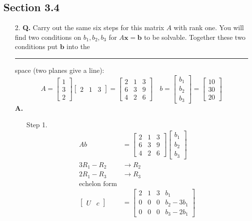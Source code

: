 \documentclass[main.tex]{subfiles}
\begin{document}
\subsection{Section 3.4}
\begin{enumerate}
    \item [2.] \textbf{Q.} Carry out the same six steps for this matrix $A$ with rank one. You will find two conditions on $b_{1}, b_{2}, b_{3}$ for $A \bm{x}=\bm{b}$ to be solvable. Together these two conditions put $\bm{b}$ into the \rule{1cm}{0.15mm} space (two planes give a line):
    $$
    A=\left[\begin{array}{l}
    1 \\
    3 \\
    2
    \end{array}\right]\left[\begin{array}{lll}
    2 & 1 & 3
    \end{array}\right]=\left[\begin{array}{lll}
    2 & 1 & 3 \\
    6 & 3 & 9 \\
    4 & 2 & 6
    \end{array}\right] \quad b=\left[\begin{array}{l}
    b_{1} \\
    b_{2} \\
    b_{3}
    \end{array}\right]=\left[\begin{array}{l}
    10 \\
    30 \\
    20
    \end{array}\right]
    $$
    \textbf{A.}
    \begin{enumerate}
        \item [Step 1.]
        $$
        \begin{aligned}
        A b &= \left[\begin{array}{lll}
        2 & 1 & 3 \\
        6 & 3 & 9 \\
        4 & 2 & 6
        \end{array}\right] \left[\begin{array}{l}
        b_{1} \\
        b_{2} \\
        b_{3}
        \end{array}\right]\\
        3R_1 - R_2 & \rightarrow R_2\\
        2R_1 - R_3 & \rightarrow R_3\\
        \text{echelon form} & \\
        \left[\begin{array}{ll}
        U & c
        \end{array}\right] &= \left[\begin{array}{cccc}
        2 & 1 & 3 & b_1 \\
        0 & 0 & 0 & b_2 - 3 b_1 \\
        0 & 0 & 0 & b_3 - 2 b_1
        \end{array}\right]
        \end{aligned}
        $$
        

\end{enumerate}
\end{enumerate}
\end{document}
